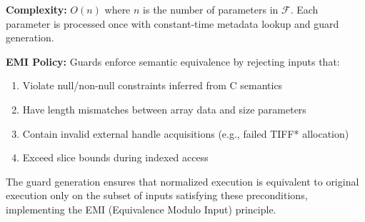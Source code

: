 \textbf{Complexity:} $O(n)$ where $n$ is the number of parameters in $\mathcal{F}$. Each parameter is processed once with constant-time metadata lookup and guard generation.

\textbf{EMI Policy:} Guards enforce semantic equivalence by rejecting inputs that:
\begin{enumerate}
    \item Violate null/non-null constraints inferred from C semantics
    \item Have length mismatches between array data and size parameters
    \item Contain invalid external handle acquisitions (e.g., failed TIFF* allocation)
    \item Exceed slice bounds during indexed access
\end{enumerate}

The guard generation ensures that normalized execution is equivalent to original execution only on the subset of inputs satisfying these preconditions, implementing the EMI (Equivalence Modulo Input) principle.
